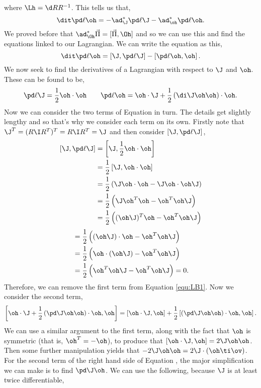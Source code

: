 where $\Lh = \d R R^{-1}$. This tells us that,
$$ \dit\pd \ell \oh = -\ad^*_\J \pd \ell \J - \ad^*_{\oh} \pd \ell \oh. $$
We proved before that $\ad^*_{\Oh}\vec\Pi = [\vec\Pi, \Oh]$ and so we can use this and find the equations linked to our Lagrangian. We can write the equation as this,
\begin{equation}
  \dit\pd \ell \oh = \left[\J, \pd \ell \J\right] - \left[\pd \ell \oh, \oh\right].\label{equ:LB1}
\end{equation}
We now seek to find the derivatives of a Lagrangian with respect to $\J$ and $\oh$. These can be found to be,
$$ \pd \ell \J = \frac{1}{2}\oh \cdot \oh \qquad \pd \ell \oh = \oh \cdot \J + \frac{1}{2}\left( \di \J \oh \oh \right) \cdot \oh. $$
Now we can consider the two terms of Equation  in turn. The details get slightly lengthy and so that's why we consider each term on its own. Firstly note that $\J^T = (R\I R^T)^T = R\I R^T = \J$ and then consider $\left[ \J, \pd \ell \J \right]$,
\begin{align*}
  \left[ \J, \pd \ell \J \right] &= \left[ \J, \frac{1}{2}\oh \cdot \oh \right]\\
  &= \frac{1}{2}\left[ \J, \oh \cdot \oh \right]\\
  &= \frac{1}{2}\left(\J\oh \cdot \oh - \J\oh \cdot \oh\J \right)\\
  &= \frac{1}{2}\left(\J\oh^T \oh - \oh^T \oh\J \right)\\
  &= \frac{1}{2}\left((\oh\J)^T \oh - \oh^T \oh\J \right)
\end{align*}
\begin{align*}
  &= \frac{1}{2}\left((\oh\J) \cdot \oh - \oh^T \oh\J \right)\\
  &= \frac{1}{2}\left(\oh \cdot (\oh\J) - \oh^T \oh\J \right)\\
  &= \frac{1}{2}\left(\oh^T\oh\J - \oh^T \oh\J \right) = 0.
\end{align*}
Therefore, we can remove the first term from Equation \ref{equ:LB1}. Now we consider the second term,
\begin{equation}
  \left[ \oh \cdot \J + \frac{1}{2}\left( \pd \J \oh \oh \right) \cdot \oh, \oh \right] = \left[ \oh \cdot \J, \oh\right] + \frac{1}{2}\left[\left( \pd \J \oh \oh \right) \cdot \oh, \oh \right].\label{equ:LB2}
\end{equation}
We can use a similar argument to the first term, along with the fact that $\oh$ is symmetric (that is, $\oh^T = -\oh$), to produce that $\left[ \oh \cdot \J, \oh\right] = 2\J \oh \oh$. Then some further manipulation yields that $-2\J \oh\oh = 2\J \cdot (\oh \ti \ov)$. For the second term of the right hand side of Equation , the major simplification we can make is to find $\pd \J \oh$. We can use the following, because $\J$ is at least twice differentiable,
